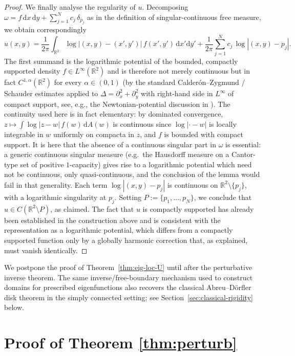 \documentclass[a4paper,11pt,reqno]{amsart}
\numberwithin{equation}{section}
\theoremstyle{plain} %
\theoremstyle{definition} %
\theoremstyle{remark}
\newcommand{\R}{\mathbb{R}}
\begin{document}
\begin{proof}
We finally analyse the regularity of $u$. Decomposing
$\omega = f\,\mathrm{d}x\,\mathrm{d}y+\sum_{j=1}^N c_j\,\delta_{p_j}$ as in
the definition of singular-continuous free measure, we obtain
correspondingly
\[
u(x,y)=\frac{1}{2\pi}\int_{\R^2}\log|(x,y)-(x',y')|\,f(x',y')\,
\mathrm{d}x'\mathrm{d}y'
+\frac{1}{2\pi}\sum_{j=1}^N c_j\,\log|(x,y)-p_j|.
\]
The first summand is the logarithmic potential of the bounded, compactly
supported density \(f\in L^\infty(\R^2)\) and is therefore not merely
continuous but in fact $C^{1,\alpha}(\R^2)$ for every $\alpha\in(0,1)$
(by the standard Calder\'on--Zygmund / Schauder estimates applied to
$\Delta=\partial_x^2+\partial_y^2$ with right-hand side in $L^\infty$
of compact support, see, e.g., the Newtonian-potential discussion in
\cite{Hormander}).
The continuity used here is in fact elementary: by dominated convergence,
$z\mapsto \int \log|z-w|\,f(w)\,\mathrm{d}A(w)$ is continuous since
$\log|\cdot-w|$ is locally integrable in $w$ uniformly on compacta in $z$,
and $f$ is bounded with compact support. It is here that the absence of a continuous
singular part in $\omega$ is essential: a generic continuous singular
measure (e.g.\ the Hausdorff measure on a Cantor-type set of positive
$1$-capacity) gives rise to a logarithmic potential which need not be
continuous, only quasi-continuous, and the conclusion of the lemma would
fail in that generality. Each term $\log|(x,y)-p_j|$ is continuous on
$\R^2\setminus\{p_j\}$, with a logarithmic singularity at $p_j$. Setting
$P:=\{p_1,\ldots,p_N\}$, we conclude that $u\in C(\R^2\setminus P)$, as
claimed. The fact that $u$ is compactly supported has already been
established in the construction above and is consistent with the
representation as a logarithmic potential, which differs from a compactly
supported function only by a globally harmonic correction that, as
explained, must vanish identically.
\end{proof}

We postpone the proof of Theorem~\ref{thm:eig-loc-U} until after the
perturbative inverse theorem. The same inverse/free-boundary mechanism used
to construct domains for prescribed eigenfunctions also recovers the
classical Abreu--D\"orfler disk theorem in the simply connected setting; see
Section~\ref{sec:classical-rigidity} below.



\section{Proof of Theorem \ref{thm:perturb}}\label{sec:perturb-proof}
\end{document}
